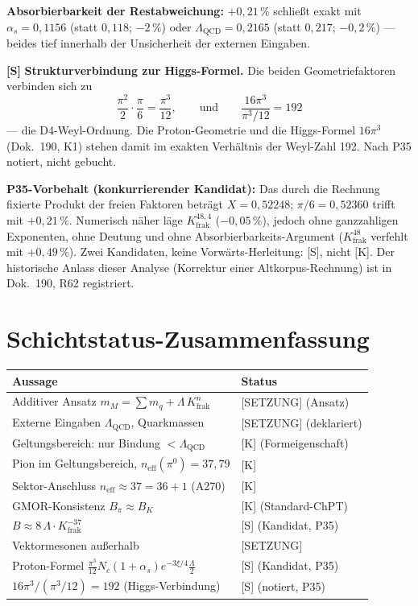 \textbf{Absorbierbarkeit der Restabweichung:} $+0{,}21\,\%$ schließt
exakt mit $\alpha_s = 0{,}1156$ (statt $0{,}118$; $-2\,\%$) oder
$\Lambda_\text{QCD} = 0{,}2165$ (statt $0{,}217$; $-0{,}2\,\%$) ---
beides tief innerhalb der Unsicherheit der externen Eingaben.

\medskip
\textbf{[S]} \textbf{Strukturverbindung zur Higgs-Formel.} Die beiden
Geometriefaktoren verbinden sich zu
\[
  \frac{\pi^2}{2}\cdot\frac{\pi}{6} = \frac{\pi^3}{12},
  \qquad\text{und}\qquad
  \frac{16\pi^3}{\pi^3/12} = 192
\]
--- die D4-Weyl-Ordnung. Die Proton-Geometrie und die Higgs-Formel
$16\pi^3$ (Dok.~190, K1) stehen damit im exakten Verhältnis der
Weyl-Zahl 192. Nach P35 notiert, nicht gebucht.

\medskip
\textbf{P35-Vorbehalt (konkurrierender Kandidat):} Das durch die
Rechnung fixierte Produkt der freien Faktoren beträgt $X = 0{,}52248$;
$\pi/6 = 0{,}52360$ trifft mit $+0{,}21\,\%$. Numerisch näher läge
$K_\text{frak}^{48{,}4}$ ($-0{,}05\,\%$), jedoch ohne ganzzahligen
Exponenten, ohne Deutung und ohne Absorbierbarkeits-Argument
($K_\text{frak}^{48}$ verfehlt mit $+0{,}49\,\%$). Zwei Kandidaten,
keine Vorwärts-Herleitung: [S], nicht [K]. Der historische Anlass
dieser Analyse (Korrektur einer Altkorpus-Rechnung) ist in Dok.~190,
R62 registriert.

\section{Schichtstatus-Zusammenfassung}

\begin{center}
\renewcommand{\arraystretch}{1.3}
{\small\begin{tabular}{ll}
\toprule
Aussage & Status \\
\midrule
Additiver Ansatz $m_M = \sum m_q + \Lambda\,K_\text{frak}^{n}$ & [SETZUNG] (Ansatz) \\
Externe Eingaben $\Lambda_\text{QCD}$, Quarkmassen & [SETZUNG] (deklariert) \\
Geltungsbereich: nur Bindung $<\Lambda_\text{QCD}$ & [K] (Formeigenschaft) \\
Pion im Geltungsbereich, $n_\text{eff}(\pi^0)=37{,}79$ & [K] \\
Sektor-Anschluss $n_\text{eff}\approx 37 = 36+1$ (A270) & [K] \\
GMOR-Konsistenz $B_\pi \approx B_K$ & [K] (Standard-ChPT) \\
$B \approx 8\,\Lambda\cdot K_\text{frak}^{-37}$ & [S] (Kandidat, P35) \\
Vektormesonen außerhalb & [SETZUNG] \\
Proton-Formel $\frac{\pi^3}{12}N_c(1+\alpha_s)e^{-3\xi/4}\frac{\Lambda}{2}$ & [S] (Kandidat, P35) \\
$16\pi^3/(\pi^3/12)=192$ (Higgs-Verbindung) & [S] (notiert, P35) \\
\bottomrule
\end{tabular}}
\renewcommand{\arraystretch}{1.0}
\end{center}

